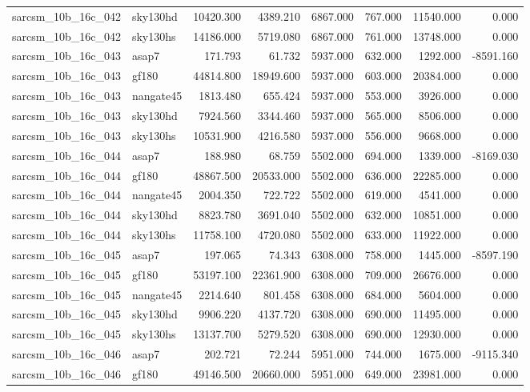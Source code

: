 \begin{tabular}{llrrrrrr}
sarcsm\_10b\_16c\_042 & sky130hd & 10420.300 & 4389.210 & 6867.000 & 767.000 & 11540.000 & 0.000 \\
sarcsm\_10b\_16c\_042 & sky130hs & 14186.000 & 5719.080 & 6867.000 & 761.000 & 13748.000 & 0.000 \\
sarcsm\_10b\_16c\_043 & asap7 & 171.793 & 61.732 & 5937.000 & 632.000 & 1292.000 & -8591.160 \\
sarcsm\_10b\_16c\_043 & gf180 & 44814.800 & 18949.600 & 5937.000 & 603.000 & 20384.000 & 0.000 \\
sarcsm\_10b\_16c\_043 & nangate45 & 1813.480 & 655.424 & 5937.000 & 553.000 & 3926.000 & 0.000 \\
sarcsm\_10b\_16c\_043 & sky130hd & 7924.560 & 3344.460 & 5937.000 & 565.000 & 8506.000 & 0.000 \\
sarcsm\_10b\_16c\_043 & sky130hs & 10531.900 & 4216.580 & 5937.000 & 556.000 & 9668.000 & 0.000 \\
sarcsm\_10b\_16c\_044 & asap7 & 188.980 & 68.759 & 5502.000 & 694.000 & 1339.000 & -8169.030 \\
sarcsm\_10b\_16c\_044 & gf180 & 48867.500 & 20533.000 & 5502.000 & 636.000 & 22285.000 & 0.000 \\
sarcsm\_10b\_16c\_044 & nangate45 & 2004.350 & 722.722 & 5502.000 & 619.000 & 4541.000 & 0.000 \\
sarcsm\_10b\_16c\_044 & sky130hd & 8823.780 & 3691.040 & 5502.000 & 632.000 & 10851.000 & 0.000 \\
sarcsm\_10b\_16c\_044 & sky130hs & 11758.100 & 4720.080 & 5502.000 & 633.000 & 11922.000 & 0.000 \\
sarcsm\_10b\_16c\_045 & asap7 & 197.065 & 74.343 & 6308.000 & 758.000 & 1445.000 & -8597.190 \\
sarcsm\_10b\_16c\_045 & gf180 & 53197.100 & 22361.900 & 6308.000 & 709.000 & 26676.000 & 0.000 \\
sarcsm\_10b\_16c\_045 & nangate45 & 2214.640 & 801.458 & 6308.000 & 684.000 & 5604.000 & 0.000 \\
sarcsm\_10b\_16c\_045 & sky130hd & 9906.220 & 4137.720 & 6308.000 & 690.000 & 11495.000 & 0.000 \\
sarcsm\_10b\_16c\_045 & sky130hs & 13137.700 & 5279.520 & 6308.000 & 690.000 & 12930.000 & 0.000 \\
sarcsm\_10b\_16c\_046 & asap7 & 202.721 & 72.244 & 5951.000 & 744.000 & 1675.000 & -9115.340 \\
sarcsm\_10b\_16c\_046 & gf180 & 49146.500 & 20660.000 & 5951.000 & 649.000 & 23981.000 & 0.000 \\

\end{tabular}
